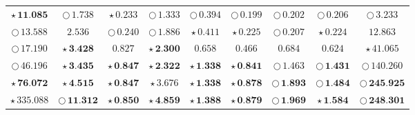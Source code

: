 \documentclass[
]{article}
\begin{document}
\begin{table}[!h]
\begin{tabular}[t]{ccccccccc}
\cellcolor[HTML]{DF536B}$\star\,\textbf{11.085}$ & \cellcolor[HTML]{F5C710}$\bigcirc\,\textit{1.738}$ & \cellcolor[HTML]{DF536B}$\star\,\textit{0.233}$ & \cellcolor[HTML]{2297E6}$\bigcirc\,\textit{1.333}$ & \cellcolor[HTML]{DF536B}$\bigcirc\,\textit{0.394}$ & \cellcolor[HTML]{F5C710}$\bigcirc\,\textit{0.199}$ & \cellcolor[HTML]{F5C710}$\bigcirc\,\textit{0.202}$ & \cellcolor[HTML]{F5C710}$\bigcirc\,\textit{0.206}$ & \cellcolor[HTML]{F5C710}$\bigcirc\,\textit{3.233}$\\
\cellcolor[HTML]{DF536B}$\bigcirc\,\textit{13.588}$ & \cellcolor[HTML]{FFFFFF}$2.536$ & \cellcolor[HTML]{DF536B}$\bigcirc\,\textit{0.240}$ & \cellcolor[HTML]{F5C710}$\bigcirc\,\textit{1.886}$ & \cellcolor[HTML]{F5C710}$\star\,\textit{0.411}$ & \cellcolor[HTML]{F5C710}$\star\,\textit{0.225}$ & \cellcolor[HTML]{2297E6}$\bigcirc\,\textit{0.207}$ & \cellcolor[HTML]{F5C710}$\star\,\textit{0.224}$ & \cellcolor[HTML]{FFFFFF}$12.863$\\
\cellcolor[HTML]{2297E6}$\bigcirc\,\textit{17.190}$ & \cellcolor[HTML]{2297E6}$\star\,\textbf{3.428}$ & \cellcolor[HTML]{FFFFFF}$0.827$ & \cellcolor[HTML]{DF536B}$\star\,\textbf{2.300}$ & \cellcolor[HTML]{FFFFFF}$0.658$ & \cellcolor[HTML]{FFFFFF}$0.466$ & \cellcolor[HTML]{FFFFFF}$0.684$ & \cellcolor[HTML]{FFFFFF}$0.624$ & \cellcolor[HTML]{F5C710}$\star\,\textit{41.065}$\\
\cellcolor[HTML]{F5C710}$\bigcirc\,\textit{46.196}$ & \cellcolor[HTML]{DF536B}$\star\,\textbf{3.435}$ & \cellcolor[HTML]{2297E6}$\star\,\textbf{0.847}$ & \cellcolor[HTML]{2297E6}$\star\,\textbf{2.322}$ & \cellcolor[HTML]{2297E6}$\star\,\textbf{1.338}$ & \cellcolor[HTML]{F5C710}$\star\,\textbf{0.841}$ & \cellcolor[HTML]{FFFFFF}$\bigcirc\,1.463$ & \cellcolor[HTML]{DF536B}$\bigcirc\,\textbf{1.431}$ & \cellcolor[HTML]{FFFFFF}$\bigcirc\,140.260$\\
\cellcolor[HTML]{F5C710}$\star\,\textbf{76.072}$ & \cellcolor[HTML]{F5C710}$\star\,\textbf{4.515}$ & \cellcolor[HTML]{DF536B}$\star\,\textbf{0.847}$ & \cellcolor[HTML]{F5C710}$\star\,\textit{3.676}$ & \cellcolor[HTML]{DF536B}$\star\,\textbf{1.338}$ & \cellcolor[HTML]{2297E6}$\star\,\textbf{0.878}$ & \cellcolor[HTML]{2297E6}$\bigcirc\,\textbf{1.893}$ & \cellcolor[HTML]{2297E6}$\bigcirc\,\textbf{1.484}$ & \cellcolor[HTML]{2297E6}$\bigcirc\,\textbf{245.925}$\\
\cellcolor[HTML]{F5C710}$\star\,\textit{335.088}$ & \cellcolor[HTML]{DF536B}$\bigcirc\,\textbf{11.312}$ & \cellcolor[HTML]{F5C710}$\star\,\textbf{0.850}$ & \cellcolor[HTML]{F5C710}$\star\,\textbf{4.859}$ & \cellcolor[HTML]{F5C710}$\star\,\textbf{1.388}$ & \cellcolor[HTML]{DF536B}$\star\,\textbf{0.879}$ & \cellcolor[HTML]{DF536B}$\bigcirc\,\textbf{1.969}$ & \cellcolor[HTML]{DF536B}$\star\,\textbf{1.584}$ & \cellcolor[HTML]{DF536B}$\bigcirc\,\textbf{248.301}$\\

\end{tabular}
\end{table}
\end{document}
